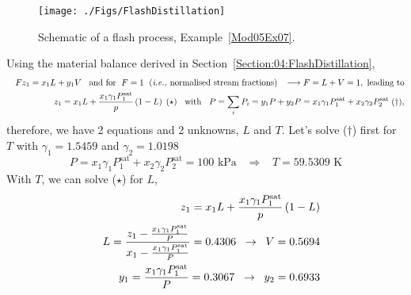 \begin{enumerate}[1)]
  \begin{figure}[h]
     \begin{center}
         \texttt{[image: ./Figs/FlashDistillation]}
     \end{center}
     \caption{Schematic of a flash process, Example~\ref{Mod05Ex07}.}
  \end{figure}

 Using the material balance derived in Section~\ref{Section:04:FlashDistillation},
\begin{eqnarray}
    && Fz_{1} = x_{1}L + y_{1}V\;\;\text{ and for } \;F=1\;\text{ (\ie normalised stream fractions)}\;\;\;\longrightarrow F = L + V = 1,\text{ leading to} \nonumber \\
    && z_{1} = x_{1}L + \frc{x_{1}\gamma_{1}P_{1}^{\text{sat}}}{p}\left(1-L\right)\;(\star)\;\; \text{ with }\;\; P=\summation[P_{i}]{i}{} = y_{1}P + y_{2}P = x_{1}\gamma_{1}P_{1}^{\text{sat}} + x_{2}\gamma_{2}P_{2}^{\text{sat}}\;(\dagger),\nonumber
\end{eqnarray}
therefore, we have 2 equations and 2 unknowns, $L$ and $T$. Let's solve ($\dagger$) first for $T$ with $\gamma_{1}=1.5459$ and $\gamma_{2}=1.0198$
   \begin{displaymath}
       P = x_{1}\gamma_{1}P_{1}^{\text{sat}} + x_{2}\gamma_{2}P_{2}^{\text{sat}} = 100 \text{ kPa} \;\;\;\Rightarrow\;\;\; T = 59.5309\text{ K}
   \end{displaymath}
 With $T$, we can solve ($\star$) for $L$,
   \begin{eqnarray}
       && z_{1} = x_{1}L + \frc{x_{1}\gamma_{1}P_{1}^{\text{sat}}}{p}\left(1-L\right) \nonumber \\
       && L = \frc{z_{1} - \frac{x_{1}\gamma_{1}P_{1}^{\text{sat}}}{P}}{x_{1} - \frac{x_{1}\gamma_{1}P_{1}^{\text{sat}}}{P}} = 0.4306\;\;\rightarrow \;\; V = 0.5694 \nonumber \\
       && y_{1} = \frac{x_{1}\gamma_{1}P_{1}^{\text{sat}}}{P} = 0.3067\;\;\rightarrow \;\; y_{2} = 0.6933\nonumber
   \end{eqnarray}
 



\end{enumerate}
